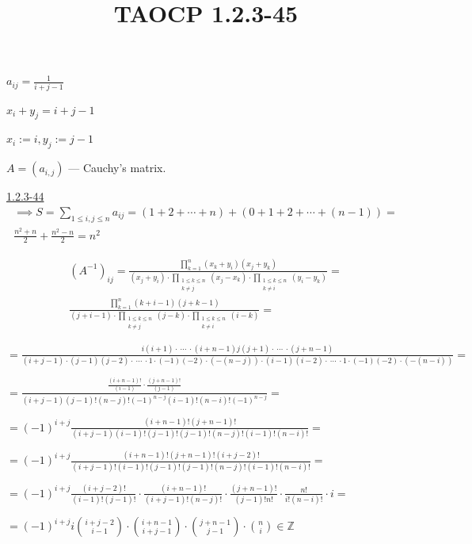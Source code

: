 \documentclass{article}
\title{TAOCP 1.2.3\mbox{-}45}
\begin{document}
\maketitle

\( a_{ij} = \frac{1}{i+j-1} \)

\( x_{i} + y_{j} = i + j - 1 \)

\( x_{i} := i, y_{j} := j - 1 \)

\( A = (a_{i,j}) \) --- Cauchy's matrix.

\href{./1.2.3-44.pdf}{1.2.3\mbox{-}44}
\begin{multline*}
\implies S = \sum_{1 \leq i,j \leq n} a_{ij} = (1 + 2 + \cdots + n) + (0 + 1 + 2 + \cdots + (n-1)) = \\
\frac{n^{2}+n}{2} + \frac{n^{2}-n}{2} = n^{2}
\end{multline*}

\begin{multline*}
{(A^{-1})}_{ij} = \frac{\prod_{k=1}^{n}(x_{k} + y_{i})(x_{j}+y_{k})}{(x_{j}+y_{i}) \cdot \prod_{\substack{1 \leq k \leq n\\ k \neq j}} (x_{j}-x_{k}) \cdot \prod_{\substack{1 \leq k \leq n\\ k \neq i}} (y_{i}-y_{k})} = \\
\frac{\prod_{k=1}^{n}(k + i - 1)(j+k-1)}{(j+i-1) \cdot \prod_{\substack{1 \leq k \leq n\\ k \neq j}} (j-k) \cdot \prod_{\substack{1 \leq k \leq n\\ k \neq i}} (i-k)} =
\end{multline*}

\( = \frac{i(i+1) \cdot\ \cdots\ \cdot (i+n-1)j(j+1) \cdot\ \cdots\ \cdot (j+n-1)}{(i+j-1) \cdot (j-1)(j-2) \cdot\ \cdots\ \cdot 1 \cdot (-1)(-2)\cdot(-(n-j)) \cdot (i - 1)(i-2) \cdot\ \cdots\ \cdot 1 \cdot (-1)(-2)\cdot(-(n-i))} = \)

\( = \frac{\frac{(i+n-1)!}{(i-1)}\cdot \frac{(j+n-1)!}{(j-1)}}{(i+j-1)(j-1)!(n-j)! {(-1)}^{n-j}(i-1)!(n-i)! {(-1)}^{n-j}} = \)

\( = {(-1)}^{i+j} \frac{(i+n-1)!(j+n-1)!}{(i+j-1)(i-1)!(j-1)!(j-1)!(n-j)! (i-1)!(n-i)!} = \)

\( = {(-1)}^{i+j} \frac{(i+n-1)!(j+n-1)!(i+j-2)!}{(i+j-1)!(i-1)!(j-1)!(j-1)!(n-j)! (i-1)!(n-i)!} = \)

\( = {(-1)}^{i+j} \frac{(i+j-2)!}{(i-1)!(j-1)!} \cdot \frac{(i+n-1)!}{(i+j-1)!(n-j)!} \cdot \frac{(j+n-1)!}{(j-1)!n!} \cdot \frac{n!}{i!(n-i)!} \cdot i = \)

\( = {(-1)}^{i+j} i \binom{i+j-2}{i-1} \cdot \binom{i+n-1}{i+j-1} \cdot \binom{j+n-1}{j-1} \cdot \binom{n}{i} \in \mathbb{Z} \)
\end{document}
